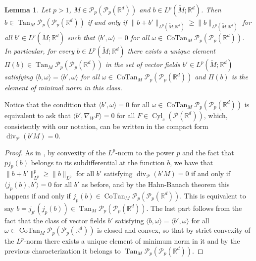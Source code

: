 \documentclass[10pt,leqno]{amsart}
\numberwithin{equation}{section}
\newtheorem{lemma}[teorema]{Lemma}
\newcommand{\R}{\mathbb{R}}
\newcommand{\PP}{\mathcal{P}}
\begin{document}
\begin{lemma}\label{lemma: minimality in the tangent}
    Let $p>1$, $M\in \PP_p(\PP_p(\R^d))$ and $b\in L^p(\widetilde{M};\R^d)$. Then $b\in \operatorname{Tan}_M \PP_p(\PP_p(\R^d))$ if and only if $\|b+ b'\|_{L^p(\widetilde{M};\R^d)} \geq \|b\|_{L^p (\widetilde{M};\R^d)}$ for all $b'\in L^p(\widetilde{M};\R^d)$ such that $\langle b',\omega \rangle = 0$ for all $\omega \in \operatorname{CoTan}_M \PP_p(\PP_p(\R^d))$.    
    \\
    In particular, for every $b \in L^p(\widetilde{M};\R^d)$ there exists a unique element $\Pi(b) \in \operatorname{Tan}_M \PP_p(\PP_p(\R^d))$ in the set of vector fields $b' \in L^p(\widetilde{M};\R^d)$ satisfying $\langle b,\omega \rangle = \langle b',\omega \rangle$ for all $\omega \in \operatorname{CoTan}_M \PP_p(\PP_p(\R^d))$ and $\Pi(b)$ is the element of minimal norm in this class.
\end{lemma}

\noindent Notice that the condition that $\langle b',\omega \rangle = 0$ for all $\omega \in \operatorname{CoTan}_M \PP_p(\PP_p(\R^d))$ is equivalent to ask that $\langle b',\nabla_W F \rangle = 0$ for all $F \in \operatorname{Cyl}_c(\PP(\R^d))$, which, consistently with our notation, can be written in the compact form $\operatorname{div}_{\PP}(b'M) = 0$.

\begin{proof}
    As in \cite[Lemma 8.4.2]{ambrosio2005gradient}, by convexity of the $L^p$-norm to the power $p$ and the fact that $pj_{p}(b)$ belongs to its subdifferential at the function $b$, we have that $\|b+b'\|_{L^p}^p \geq \|b\|_{L^p}$ for all $b'$ satisfying $\operatorname{div}_{\PP}(b'M)=0$ if and only if $\langle j_p(b),b' \rangle = 0$ for all $b'$ as before, and by the Hahn-Banach theorem this happens if and only if $j_p(b) \in \operatorname{CoTan}_M \PP_p(\PP_p(\R^d))$. This is equivalent to say $b = j_{p'}(j_p(b)) \in \operatorname{Tan}_M \PP_p(\PP_p(\R^d))$. The last part follows from the fact that the class of vector fields $b'$ satisfying $\langle b,\omega \rangle = \langle b' ,\omega \rangle$ for all $\omega \in \operatorname{CoTan}_M \PP_p(\PP_p(\R^d))$ is closed and convex, so that by strict convexity of the $L^p$-norm there exists a unique element of minimum norm in it and by the previous characterization it belongs to $\operatorname{Tan}_M \PP_p(\PP_p(\R^d))$.
\end{proof}
\end{document}
